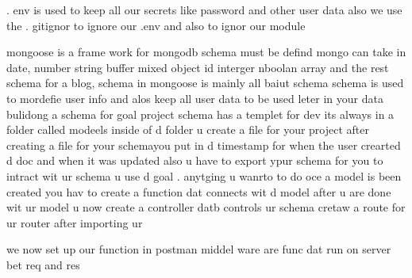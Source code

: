 . env is used to keep all our secrets like password and other user data
also we use the . gitignor to ignore our .env and also to ignor our module

mongoose is a frame work for mongodb 
schema must be defind mongo can take in date, number string buffer mixed object id interger nboolan array and the rest
 schema for a blog, 
 schema in mongoose is mainly all baiut schema
 schema is used to mordefie user info and alos keep all user data to be used leter  in your data
 bulidong a schema for goal project schema has a templet for dev its always in a folder called modeels
 inside of d folder u create a file for your project
 after creating  a file for your schemayou put in d timestamp for when the user crearted d doc and when it was updated
 also u have to export ypur schema for you to intract wit ur schema u use d goal  . anytging u wanrto to do 
  oce a model is been created you hav to  create a function dat connects wit d model
  after u are done wit ur model u now create a controller datb controls ur schema
cretaw a route for ur router after importing ur 

 we now set up our function in postman 
 middel ware are func dat run on server bet req and res